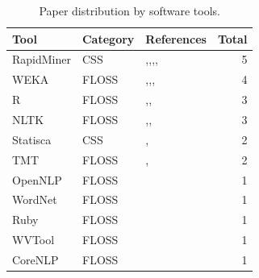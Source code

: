 \begin{table}[h!]
  \centering
  \captionsetup{type=table}
  \caption{Paper distribution by software tools.}
  \begin{tabular}{@{}llp{6cm}r@{}}
    \toprule
    \textbf{Tool} & \textbf{Category} & \textbf{References} & \textbf{Total} \\
    \midrule
    RapidMiner & CSS & \cite{Chaturvedi:2012},\cite{Meera:2014},\cite{Sharma:2015},\cite{Gujral:2015},\cite{Singh:2017} & 5 \\
    \midrule
    WEKA & FLOSS & \cite{Lamkanfi:2011},\cite{Xia:2015},\cite{Pushpalathas:2016},\cite{Tian:2016} & 4 \\
    \midrule
    R & FLOSS & \cite{Yang:2014b},\cite{Zhang:2015},\cite{Yang:2017} & 3 \\
    \midrule
    NLTK & FLOSS & \cite{Roy:2014},\cite{Zhang:2016},\cite{Jin:2016b} & 3 \\
    \midrule
    Statisca & CSS & \cite{Chaturvedi:2012},\cite{Meera:2014} & 2 \\
    \midrule
    TMT & FLOSS & \cite{Yang:2014b},\cite{Zhang:2016} & 2 \\
    \midrule
    OpenNLP & FLOSS & \cite{Tian:2012} & 1 \\
    \midrule
    WordNet & FLOSS & \cite{Roy:2014} & 1 \\
    \midrule
    Ruby & FLOSS & \cite{Lamkanfi:2010} & 1 \\
    \midrule
    WVTool & FLOSS & \cite{Yang:2012} & 1 \\
    \midrule
    CoreNLP & FLOSS & \cite{Yang:2017} & 1 \\
    \bottomrule
  \end{tabular} 
  \label{tab:software_tools_used_in_papers}
\end{table}

